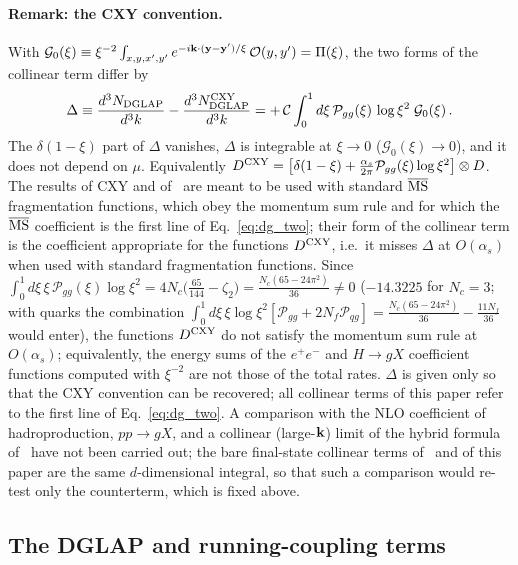\paragraph{Remark: the CXY convention.} With $\mathcal G_0(\xi)\equiv\xi^{-2}\int_{x,y,x',y'}e^{-i\mathbf{k}\cdot(\mathbf{y}-\mathbf{y}')/\xi}\,\mathcal O(y,y')=\Pi(\xi)$, the two forms of the collinear term differ by
\begin{align}\label{eq:dg_Delta}
\Delta\equiv\frac{d^3N_{\rm DGLAP}}{d^3k}-\frac{d^3N^{\rm CXY}_{\rm DGLAP}}{d^3k}=+\,\mathcal C\int_0^1d\xi\,\mathcal P_{gg}(\xi)\,\log\xi^2\;\mathcal G_0(\xi)\,.
\end{align}
The $\delta(1-\xi)$ part of $\Delta$ vanishes, $\Delta$ is integrable at $\xi\to0$ ($\mathcal G_0(\xi)\to0$), and it does not depend on $\mu$. Equivalently $D^{\rm CXY}=\big[\delta(1-\xi)+\frac{\alpha_s}{2\pi}\mathcal P_{gg}(\xi)\log\xi^2\big]\otimes D$. The results of CXY and of~\cite{Altinoluk:2014eka} are meant to be used with standard $\overline{\rm MS}$ fragmentation functions, which obey the momentum sum rule and for which the $\overline{\rm MS}$ coefficient is the first line of Eq.~\eqref{eq:dg_two}; their form of the collinear term is the coefficient appropriate for the functions $D^{\rm CXY}$, i.e.\ it misses $\Delta$ at $O(\alpha_s)$ when used with standard fragmentation functions. Since $\int_0^1d\xi\,\xi\,\mathcal P_{gg}(\xi)\log\xi^2=4N_c\big(\frac{65}{144}-\zeta_2\big)=\frac{N_c(65-24\pi^2)}{36}\neq0$ ($-14.3225$ for $N_c=3$; with quarks the combination $\int_0^1d\xi\,\xi\log\xi^2[\mathcal P_{gg}+2N_f\mathcal P_{qg}]=\frac{N_c(65-24\pi^2)}{36}-\frac{11N_f}{36}$ would enter), the functions $D^{\rm CXY}$ do not satisfy the momentum sum rule at $O(\alpha_s)$; equivalently, the energy sums of the $e^+e^-$ and $H\to gX$ coefficient functions computed with $\xi^{-2}$ are not those of the total rates. $\Delta$ is given only so that the CXY convention can be recovered; all collinear terms of this paper refer to the first line of Eq.~\eqref{eq:dg_two}. A comparison with the NLO coefficient of hadroproduction, $pp\to gX$, and a collinear (large-$\mathbf{k}$) limit of the hybrid formula of~\cite{Chirilli:2012jd} have not been carried out; the bare final-state collinear terms of~\cite{Chirilli:2012jd} and of this paper are the same $d$-dimensional integral, so that such a comparison would re-test only the counterterm, which is fixed above.

\subsection{The DGLAP and running-coupling terms}\label{sec:dg_final}

